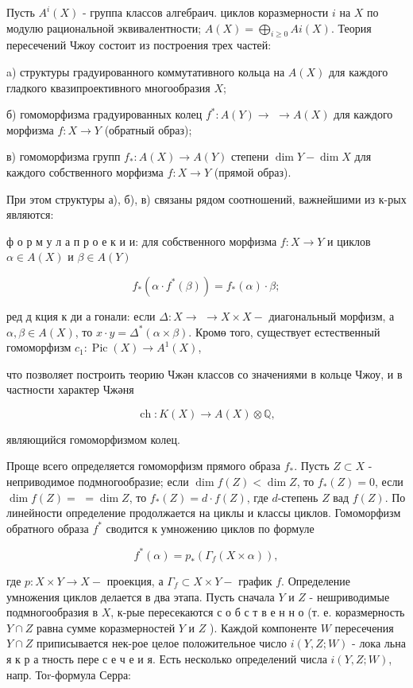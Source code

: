 \documentclass[10pt]{article}
\begin{document}
Пусть $A^{i}(X)$ - группа классов алгебраич. циклов коразмерности $i$ на $X$ по модулю рациональной эквивалентности; $A(X)=\bigoplus_{i \geqslant 0} A i(X)$. Теория пересечений Чжоу состоит из построения трех частей:

a) структуры градуированного коммутативного кольца на $A(X)$ для каждого гладкого квазипроективного многообразия $X$;

б) гомоморфизма градуированных колец $f^{*}: A(Y) \rightarrow$ $\rightarrow A(X)$ для каждого морфизма $f: X \rightarrow Y$ (обратный образ);

в) гомоморфизма групп $f_{*}: A(X) \rightarrow A(Y)$ степени $\operatorname{dim} Y-\operatorname{dim} X$ для каждого собственного морфизма $f: X \rightarrow Y$ (прямой образ).

При этом структуры а), б), в) связаны рядом соотношений, важнейшими из к-рых являются:

ф о р м у л а п р о е к и и: для собственного морфизма $f: X \rightarrow Y$ и циклов $\alpha \in A(X)$ и $\beta \in A(Y)$

\[
f_{*}\left(\alpha \cdot f^{*}(\beta)\right)=f_{*}(\alpha) \cdot \beta ;
\]

ред д кция к ди а гонали: если $\Delta: X \rightarrow$ $\rightarrow X \times X-$ диагональный морфизм, а $\alpha, \beta \in A(X)$, то $x \cdot y=\Delta^{*}(\alpha \times \beta)$. Кромө того, существует естественный гомоморфизм $c_{1}: \operatorname{Pic}(X) \longrightarrow A^{1}(X)$,

что позволяет построить теорию Чжән классов со значениями в кольце Чжоу, и в частности характер Чжәня

\[
\operatorname{ch}: K(X) \longrightarrow A(X) \otimes \mathbb{Q},
\]

являющийся гомоморфизмом колец.

Проще всего определяется гомоморфизм прямого образа $f_{*}$. Пусть $Z \subset X$ - неприводимое подмногообразие; если $\operatorname{dim} f(Z)<\operatorname{dim} Z$, то $f_{*}(Z)=0$, если $\operatorname{dim} f(Z)=$ $=\operatorname{dim} Z$, то $f_{*}(Z)=d \cdot f(Z)$, где $d$-степень $Z$ вад $f(Z)$. По линейности определение продолжается на циклы и классы циклов. Гомоморфизм обратного образа $f^{*}$ сводится к умножению циклов по формуле

\[
f^{*}(\alpha)=p_{*}\left(\Gamma_{f}(X \times \alpha)\right),
\]

где $p: X \times Y \rightarrow X-$ проекция, а $\Gamma_{f} \subset X \times Y-$ график $f$. Определение умножения циклов делается в два этапа. Пусть сначала $Y$ и $Z$ - нешриводимые подмногообразия в $X$, к-рые пересекаются с о б с т в е н н о (т. е. коразмерность $Y \cap Z$ равна сумме коразмерностей $Y$ и $Z$ ). Каждой компоненте $W$ пересечения $Y \cap Z$ приписывается нек-рое целое положительное число $i(Y, Z ; W)$ - лока льна я к р а тность пере с е ч е и я. Есть несколько определений числа $i(Y, Z ; W)$, напр. Тоr-формула Серра:
\end{document}
